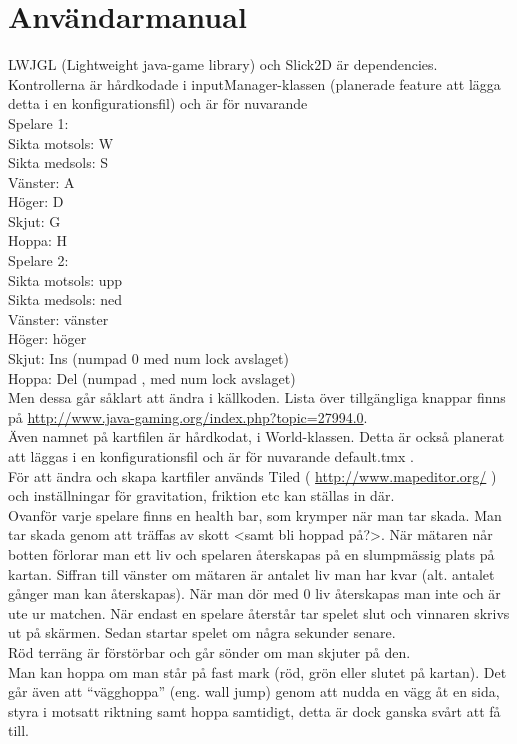 \section{Användarmanual}
LWJGL (Lightweight java-game library) och Slick2D är dependencies.\\
\vspace{11pt}
Kontrollerna är hårdkodade i inputManager-klassen (planerade feature att lägga detta i en konfigurationsfil) och är för nuvarande\\
\vspace{11pt}
Spelare 1:\\
Sikta motsols: W\\
Sikta medsols: S\\
Vänster: A\\
Höger: D\\
Skjut: G\\
Hoppa: H\\
\vspace{11pt}
Spelare 2:\\
Sikta motsols: upp\\
Sikta medsols: ned\\
Vänster: vänster\\
Höger: höger\\
Skjut: Ins (numpad 0 med num lock avslaget)\\
Hoppa: Del (numpad , med num lock avslaget)\\
\vspace{11pt}
Men dessa går såklart att ändra i källkoden. Lista över tillgängliga knappar finns på \url{http://www.java-gaming.org/index.php?topic=27994.0}.\\
\vspace{11pt}
\vspace{11pt}
Även namnet på kartfilen är hårdkodat, i World-klassen. Detta är också planerat att läggas i en konfigurationsfil och är för nuvarande default.tmx .\\
För att ändra och skapa kartfiler används Tiled ( \url{http://www.mapeditor.org/} ) och inställningar för gravitation, friktion etc kan ställas in där.\\
\vspace{11pt}
Ovanför varje spelare finns en health bar, som krymper när man tar skada. Man tar skada genom att träffas av skott <samt bli hoppad på?>. När mätaren når botten förlorar man ett liv och spelaren återskapas på en slumpmässig plats på kartan. Siffran till vänster om mätaren är antalet liv man har kvar (alt. antalet gånger man kan återskapas). När man dör med 0 liv återskapas man inte och är ute ur matchen. När endast en spelare återstår tar spelet slut och vinnaren skrivs ut på skärmen. Sedan startar spelet om några sekunder senare.\\
\pagebreak
Röd terräng är förstörbar och går sönder om man skjuter på den.\\
\vspace{11pt}
Man kan hoppa om man står på fast mark (röd, grön eller slutet på kartan). Det går även att ``vägghoppa'' (eng. wall jump) genom att nudda en vägg åt en sida, styra i motsatt riktning samt hoppa samtidigt, detta är dock ganska svårt att få till.\\
